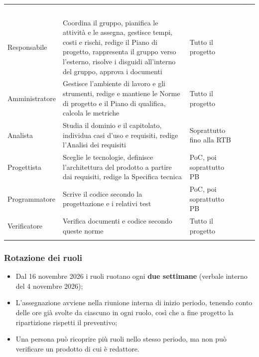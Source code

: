 \documentclass[12pt,a4paper]{article}
\newcommand{\tightlist}{\setlength{\itemsep}{1pt}\setlength{\parskip}{0pt}}
\newcommand{\thc}[1]{\textcolor{white}{\textbf{#1}}}
\newcommand{\rl}{\arrayrulecolor{bfline}\hline}
\begin{document}
\begin{center}
\begin{tabularx}{\linewidth}{>{\hsize=0.55\hsize\raggedright\arraybackslash}X>{\hsize=1.55\hsize\raggedright\arraybackslash}X>{\hsize=0.5\hsize\raggedright\arraybackslash}X>{\hsize=0.4\hsize\centering\arraybackslash}X}
\rowcolor{bfblue}\thc{Ruolo} & \thc{Compiti principali} & \thc{Presenza} & \thc{€/h} \\
Responsabile & Coordina il gruppo, pianifica le attività e le assegna, gestisce tempi, costi e rischi, redige il Piano di progetto, rappresenta il gruppo verso l'esterno, risolve i disguidi all'interno del gruppo, approva i documenti & Tutto il progetto & 30 \\ \rl
Amministratore & Gestisce l'ambiente di lavoro e gli strumenti, redige e mantiene le Norme di progetto e il Piano di qualifica, calcola le metriche & Tutto il progetto & 20 \\ \rl
Analista & Studia il dominio e il capitolato, individua casi d'uso e requisiti, redige l'Analisi dei requisiti & Soprattutto fino alla RTB & 25 \\ \rl
Progettista & Sceglie le tecnologie, definisce l'architettura del prodotto a partire dai requisiti, redige la Specifica tecnica & PoC, poi soprattutto PB & 25 \\ \rl
Programmatore & Scrive il codice secondo la progettazione e i relativi test & PoC, poi soprattutto PB & 15 \\ \rl
Verificatore & Verifica documenti e codice secondo queste norme & Tutto il progetto & 15 \\ \rl
\end{tabularx}
\end{center}

\subsubsection{Rotazione dei ruoli}
\begin{itemize}
\tightlist
\item Dal 16 novembre 2026 i ruoli ruotano ogni \textbf{due settimane} (verbale interno del 4 novembre 2026);
\item L'assegnazione avviene nella riunione interna di inizio periodo, tenendo conto delle ore già svolte da ciascuno in ogni ruolo, così che a fine progetto la ripartizione rispetti il preventivo;
\item Una persona può ricoprire più ruoli nello stesso periodo, ma non può verificare un prodotto di cui è redattore.
\end{itemize}
\end{document}
